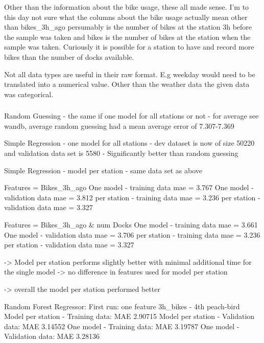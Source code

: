 \documentclass[a4paper]{article}
\begin{document}
    Other than the information about the bike usage, these all made sense. I'm to this day not sure what the columns
    about the bike usage actually mean other than bikes\_3h\_ago persumably is the number of bikes at the station 3h
    before the sample was taken and bikes is the number of bikes at the station when the sample was taken. Curiously it
    is possible for a station to have and record more bikes than the number of docks available.

    Not all data types are useful in their raw format. E.g weekday would need to be translated into a numerical value.
    Other than the weather data the given data was categorical.

    \subsubsection*{}

    Random Guessing - the same if one model for all stations or not
    - for average see wandb, average random guessing had a mean average error of 7.307-7.369

    Simple Regression - one model for all stations
    - dev dataset is now of size 50220 and validation data set is 5580
    - Significantly better than random guessing

    Simple Regression - model per station
    - same data set as above

    Features = Bikes\_3h\_ago
    One model - training data mae = 3.767
    One model - validation data mae = 3.812
    per station - training data mae = 3.236
    per station - validation data mae = 3.327

    Features = Bikes\_3h\_ago \& num Docks
    One model - training data mae = 3.661
    One model - validation data mae = 3.706
    per station - training data mae = 3.236
    per station - validation data mae = 3.327

    -> Model per station performs slightly better with minimal additional time for the single model
    -> no difference in features used for model per station

    -> overall the model per station performed better

    Random Forest Regressor:
    First run: one feature 3h\_bikes - 4th peach-bird
    Model per station - Training data: MAE 2.90715
    Model per station - Validation data: MAE 3.14552
    One model - Training data: MAE 3.19787
    One model - Validation data: MAE 3.28136
\end{document}
